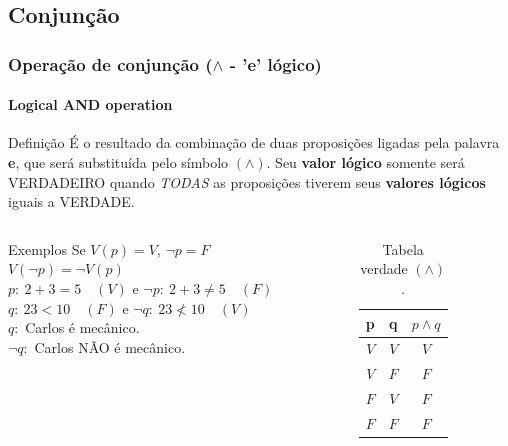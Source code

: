 \documentclass[10pt, headsepline, captions=tableabove,xcolor=table]{beamer}
\begin{document}
\subsection{Conjunção}
%

\begin{frame}[t]
    \frametitle{Operação de conjunção ($\land$ - 'e' lógico)}
    \framesubtitle{Logical AND operation}
    \begin{block}{Definição}
        É o resultado da combinação de duas proposições ligadas pela palavra \textbf{e}, que será substituída pelo símbolo $(\land)$. Seu \textbf{valor lógico} somente será VERDADEIRO quando \emph{TODAS} as proposições tiverem seus \textbf{valores lógicos} iguais a VERDADE.
    \end{block}
    \vspace{-4mm}
    \begin{columns}[t]
        \begin{column}{0.6\textwidth}
            \begin{exampleblock}{Exemplos}
                Se $V(p) = V$, $\lnot p = F$ \\ [2pt]
                $V(\lnot p) = \lnot V(p)$ \\ [2pt]
                $p:~2+3=5\quad (V)$ e $\lnot p:~2+3 \neq 5\quad (F)$ \\ [2pt]
                $q:~23 < 10 \quad (F)$ e $\lnot q:~23 \nless 10 \quad (V)$ \\[2pt]
                $q:$ Carlos é mecânico. \\[2pt]
                $\lnot q:$ Carlos NÃO é mecânico.
            \end{exampleblock}
        \end{column}
        \hspace{-3mm}
        \begin{column}{0.4\textwidth}
            \begin{table}[]
                \caption{Tabela verdade $(\land)$.}
                \label{tab:table-and}
                \begin{tabular}{|c|c|c|}
                \hline
                \rowcolor[HTML]{EFEFEF} 
                \textbf{p} & \textbf{q} & \textbf{$p \land q$} \\ \hline
                $V$          & $V$          & $V$                    \\ \hline
                $V$          & $F$          & $F$                    \\ \hline
                $F$          & $V$          & $F$                   \\ \hline
                $F$          & $F$          & $F$                    \\ \hline
                \end{tabular}
            \end{table}
        \end{column}
    \end{columns}
\end{frame}
%
\end{document}
